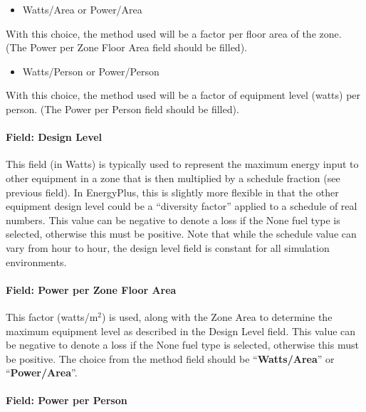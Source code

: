 \begin{itemize}
\tightlist
\item
  Watts/Area or Power/Area
\end{itemize}

With this choice, the method used will be a factor per floor area of the zone. (The Power per Zone Floor Area field should be filled).

\begin{itemize}
\tightlist
\item
  Watts/Person or Power/Person
\end{itemize}

With this choice, the method used will be a factor of equipment level (watts) per person. (The Power per Person field should be filled).

\paragraph{Field: Design Level}\label{field-design-level-4}

This field (in Watts) is typically used to represent the maximum energy input to other equipment in a zone that is then multiplied by a schedule fraction (see previous field). In EnergyPlus, this is slightly more flexible in that the other equipment design level could be a ``diversity factor'' applied to a schedule of real numbers. This value can be negative to denote a loss if the None fuel type is selected, otherwise this must be positive. Note that while the schedule value can vary from hour to hour, the design level field is constant for all simulation environments.

\paragraph{Field: Power per Zone Floor Area}\label{field-power-per-zone-floor-area-3}

This factor (watts/m\(^{2}\)) is used, along with the Zone Area to determine the maximum equipment level as described in the Design Level field. This value can be negative to denote a loss if the None fuel type is selected, otherwise this must be positive. The choice from the method field should be ``\textbf{Watts/Area}'' or ``\textbf{Power/Area}''.

\paragraph{Field: Power per Person}\label{field-power-per-person-3}

